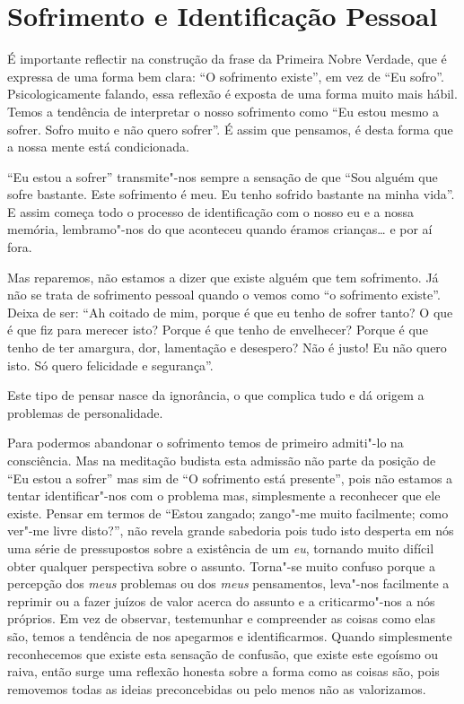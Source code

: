 \section{Sofrimento e Identificação Pessoal}

É importante reflectir na construção da frase da Primeira Nobre Verdade, que é
expressa de uma forma bem clara: “O sofrimento existe”, em vez de “Eu sofro”.
Psicologicamente falando, essa reflexão é exposta de uma forma muito mais hábil.
Temos a tendência de interpretar o nosso sofrimento como “Eu estou mesmo a
sofrer. Sofro muito e não quero sofrer”. É assim que pensamos, é desta forma que
a nossa mente está condicionada.

“Eu estou a sofrer” transmite"-nos sempre a sensação de que “Sou alguém que sofre
bastante. Este sofrimento é meu. Eu tenho sofrido bastante na minha vida”. E
assim começa todo o processo de identificação com o nosso eu e a nossa memória,
lembramo"-nos do que aconteceu quando éramos crianças\ldots{} e por aí fora.

Mas reparemos, não estamos a dizer que existe alguém que tem sofrimento. Já não
se trata de sofrimento pessoal quando o vemos como “o sofrimento existe”. Deixa
de ser: “Ah coitado de mim, porque é que eu tenho de sofrer tanto? O que é que
fiz para merecer isto? Porque é que tenho de envelhecer? Porque é que tenho de
ter amargura, dor, lamentação e desespero? Não é justo! Eu não quero isto. Só
quero felicidade e segurança”.

Este tipo de pensar nasce da ignorância, o que complica tudo e dá origem a
problemas de personalidade.

Para podermos abandonar o sofrimento temos de primeiro admiti"-lo na consciência.
Mas na meditação budista esta admissão não parte da posição de “Eu estou a
sofrer” mas sim de “O sofrimento está presente”, pois não estamos a tentar
identificar"-nos com o problema mas, simplesmente a reconhecer que ele existe.
Pensar em termos de “Estou zangado; zango"-me muito facilmente; como ver"-me livre
disto?”, não revela grande sabedoria pois tudo isto desperta em nós uma série de
pressupostos sobre a existência de um \emph{eu}, tornando muito difícil obter
qualquer perspectiva sobre o assunto. Torna"-se muito confuso porque a percepção
dos \emph{meus} problemas ou dos \emph{meus} pensamentos, leva"-nos facilmente a
reprimir ou a fazer juízos de valor acerca do assunto e a criticarmo"-nos a nós
próprios. Em vez de observar, testemunhar e compreender as coisas como elas são,
temos a tendência de nos apegarmos e identificarmos. Quando simplesmente
reconhecemos que existe esta sensação de confusão, que existe este egoísmo ou
raiva, então surge uma reflexão honesta sobre a forma como as coisas são, pois
removemos todas as ideias preconcebidas ou pelo menos não as valorizamos.

